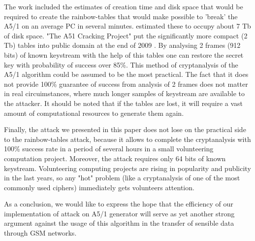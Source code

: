 \documentclass[runningheads,a4paper]{llncs}[2015/06/24]
\newcommand{\commentatside}[1]{\pdfcomment[color={0.045 0.278 0.643},icon=Note]{#1}}
\newcommand{\todo}[1]{\commentatside{#1}}
\begin{document}
The work \cite{COPAC_2} included the estimates of creation time and disk space
that would be required to create the rainbow-tables that would make possible to
'break' the A5/1 on an average PC in several minutes. \cite{COPAC_2} estimated
these to occupy about 7 Tb of disk space. "The A51 Cracking Project" put the
significantly more compact (2 Tb) tables into public domain at the end of 2009
\todo {cite what?}. By analysing 2 frames (912 bits) of known keystream with
the help of this tables one can restore the secret key with probability of
success over 85\%. This method of cryptanalysis of the A5/1 algorithm could be
assumed to be the most practical. The fact that it does not provide 100\%
guarantee of success from analysis of 2 frames does not matter in real
circuimstances, where much longer samples of keystream are available to the
attacker. It should be noted that if the tables are lost, it will require a
vast amount of computational resources to generate them again.

Finally, the attack we presented in this paper does not lose on the practical
side to the rainbow-tables attack, because it allows to complete the
cryptanalysis with 100\% success rate in a period of several hours in a small
volunteering computation project. Moreover, the attack requires only 64 bits of
known keystream. Volunteering computing projects are rising in popularity and
publicity in the last years, so any "hot" problem (like a cryptanalysis of one
of the most commonly used ciphers) immediately gets volunteers attention.

As a conclusion, we would like to express the hope that the efficiency of our
implementation of attack on A5/1 generator will serve as yet another strong
argument against the usage of this algorithm in the transfer of sensible data
through GSM networks.





\end{document}
